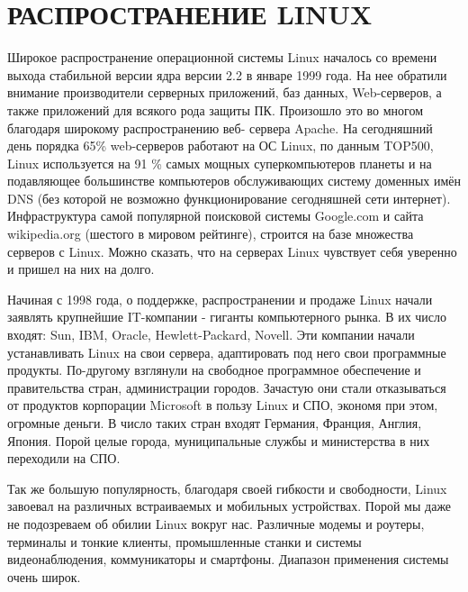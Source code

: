 \documentclass[bachelor, och, referat, times]{SCWorks}
\begin{document}
\section{РАСПРОСТРАНЕНИЕ LINUX}
\par Широкое распространение операционной системы 
Linux началось со 
времени выхода стабильной версии ядра версии 2.2 в 
январе 1999 года. На 
нее обратили внимание производители серверных 
приложений, баз данных, 
Web-серверов, а также приложений для всякого рода 
защиты ПК. Произошло это
во многом благодаря широкому распространению веб-
сервера Apache. На 
сегодняшний день порядка 65\% web-серверов работают 
на ОС Linux, по данным
TOP500, Linux используется на 91 \% самых мощных 
суперкомпьютеров планеты 
и на подавляющее большинстве компьютеров 
обслуживающих систему доменных 
имён DNS (без которой не возможно функционирование 
сегодняшней сети 
интернет). Инфраструктура самой популярной 
поисковой системы Google.com и 
сайта wikipedia.org (шестого в мировом рейтинге), 
строится на базе 
множества серверов с Linux. Можно сказать, что на 
серверах Linux чувствует
себя уверенно и пришел на них на долго.

\par Начиная с 1998 года, о поддержке, 
распространении и продаже Linux 
начали заявлять крупнейшие IT-компании - гиганты 
компьютерного рынка. В их
число входят: Sun, IBM, Oracle, Hewlett-Packard, 
Novell. Эти компании 
начали устанавливать Linux на свои сервера, 
адаптировать под него свои 
программные продукты. По-другому взглянули на 
свободное программное 
обеспечение и правительства стран, администрации 
городов. Зачастую они 
стали отказываться от продуктов корпорации 
Microsoft в пользу Linux и СПО,
экономя при этом, огромные деньги. В число таких 
стран входят Германия, 
Франция, Англия, Япония. Порой целые города, 
муниципальные службы и 
министерства в них переходили на СПО.

\par Так же большую популярность, благодаря своей 
гибкости и свободности, 
Linux завоевал на различных встраиваемых и 
мобильных устройствах. Порой мы
даже не подозреваем об обилии Linux вокруг нас. 
Различные модемы и 
роутеры, терминалы и тонкие клиенты, промышленные 
станки и системы 
видеонаблюдения, коммуникаторы и смартфоны. 
Диапазон применения системы 
очень широк.
\end{document}
